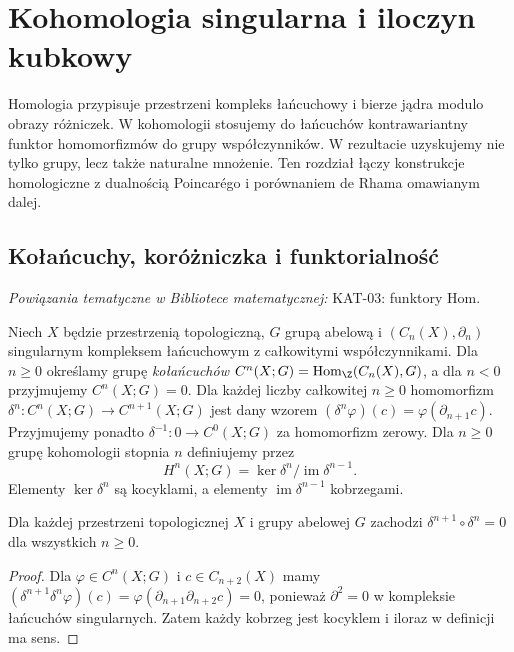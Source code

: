 \chapter{Kohomologia singularna i iloczyn kubkowy}
\label{ch:kohomologia-singularna}

\providecommand{\atlasref}[2]{#2}


Homologia przypisuje przestrzeni kompleks łańcuchowy i bierze jądra
modulo obrazy różniczek. W kohomologii stosujemy do łańcuchów
kontrawariantny funktor homomorfizmów do grupy współczynników.
W rezultacie uzyskujemy nie tylko grupy, lecz także naturalne mnożenie.
Ten rozdział łączy konstrukcje homologiczne z dualnością Poincarégo
i porównaniem de Rhama omawianym dalej.

\section{Kołańcuchy, koróżniczka i funktorialność}

\noindent\emph{Powiązania tematyczne w Bibliotece matematycznej:} \atlasref{KAT-03::def:hom-funktory}{KAT-03: funktory Hom}.


\begin{definicja}
Niech $X$ będzie przestrzenią topologiczną, $G$ grupą abelową i
$(C_n(X),\partial_n)$ singularnym kompleksem łańcuchowym z całkowitymi
współczynnikami. Dla $n\geq0$ określamy grupę \emph{kołańcuchów}
$C^n(X;G)=\operatorname{Hom}_{\Z}(C_n(X),G)$, a dla $n<0$ przyjmujemy
$C^n(X;G)=0$. Dla każdej liczby całkowitej $n\geq0$
homomorfizm
$\delta^n:C^n(X;G)\to C^{n+1}(X;G)$ jest dany wzorem
$(\delta^n\varphi)(c)=\varphi(\partial_{n+1}c)$.
Przyjmujemy ponadto $\delta^{-1}:0\to C^0(X;G)$
za homomorfizm zerowy.
Dla $n\geq0$ grupę kohomologii stopnia $n$ definiujemy przez
\[
H^n(X;G)=\ker\delta^n/\operatorname{im}\delta^{n-1}.
\]
Elementy $\ker\delta^n$ są kocyklami, a elementy
$\operatorname{im}\delta^{n-1}$ kobrzegami.
\end{definicja}

\begin{stwierdzenie}
Dla każdej przestrzeni topologicznej $X$ i grupy abelowej $G$
zachodzi $\delta^{n+1}\circ\delta^n=0$ dla wszystkich $n\geq0$.
\end{stwierdzenie}
\begin{proof}
Dla $\varphi\in C^n(X;G)$ i $c\in C_{n+2}(X)$ mamy
$(\delta^{n+1}\delta^n\varphi)(c)
=\varphi(\partial_{n+1}\partial_{n+2}c)=0$,
ponieważ $\partial^2=0$ w kompleksie łańcuchów singularnych.
Zatem każdy kobrzeg jest kocyklem i iloraz w definicji ma sens.
\end{proof}

